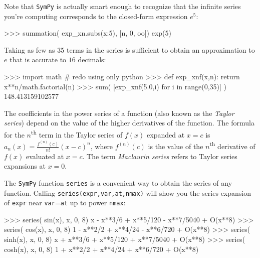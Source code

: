 \noindent
Note that \texttt{SymPy} is actually smart enough to recognize that the infinite series
you're computing corresponds to the closed-form expression $e^5$:



\small
\begin{verbatimtab}
>>> summation( exp_xn.subs({x:5}), [n, 0, oo])
exp(5)
\end{verbatimtab}
\normalsize
Taking as few as 35 terms in the series is sufficient to obtain an approximation to $e$
that is accurate to $16$ decimals:

\small
\begin{verbatimtab}
>>> import math                    # redo using only python 
>>> def exp_xnf(x,n): 
        return x**n/math.factorial(n)
>>> sum( [exp_xnf(5.0,i) for i in range(0,35)] )
148.413159102577
\end{verbatimtab}
\normalsize

\noindent
The coefficients in the power series of a function (also known as the \emph{Taylor series})
depend on the value of the higher derivatives of the function. 
The formula for the $n$\textsuperscript{th} term in the Taylor series of $f(x)$ expanded at $x=c$ is $a_n(x) = \frac{f^{(n)}(c)}{n!}(x-c)^n$,
where $f^{(n)}(c)$ is the value of the $n$\textsuperscript{th} derivative of $f(x)$ evaluated at $x=c$.
The term \emph{Maclaurin series} refers to Taylor series expansions at $x=0$.										

The \texttt{SymPy} function \texttt{series} is a convenient way to obtain the series of any function.
Calling \texttt{series(expr,var,at,nmax)} 
will show you the series expansion of \texttt{expr} 
near \texttt{var}=\texttt{at} 
up to power \texttt{nmax}:

\small
\begin{verbatimtab}
>>> series( sin(x), x, 0, 8)
x - x**3/6 + x**5/120 - x**7/5040 + O(x**8)
>>> series( cos(x), x, 0, 8)
1 - x**2/2 + x**4/24 - x**6/720 + O(x**8)
>>> series( sinh(x), x, 0, 8)
x + x**3/6 + x**5/120 + x**7/5040 + O(x**8)
>>> series( cosh(x), x, 0, 8)
1 + x**2/2 + x**4/24 + x**6/720 + O(x**8)
\end{verbatimtab}
\normalsize


